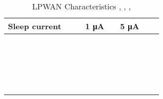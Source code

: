 \begin{longtable}{l|l|l|l|l|l|l|l}
	Sleep current                        &                  &              & 1 μA                   &               & 5 μA                                   &                   & \\\hline
	\                                    &                  &              &                        &               &                                        &                   & \\\hline
	\                                    &                  &              &                        &               &                                        &                   & \\\hline
	\                                    &                  &              &                        &               &                                        &                   & \\\hline
	\                                    &                  &              &                        &               &                                        &                   & \\\hline

\caption{\label{tab:LPWan_characteristics} LPWAN Characteristics \cite{al-kashoash_comparison_2016}, \cite{lopes_design_2019}, \cite{raza_low_22}, \cite{ayoub_internet_2019}}
\end{longtable}

